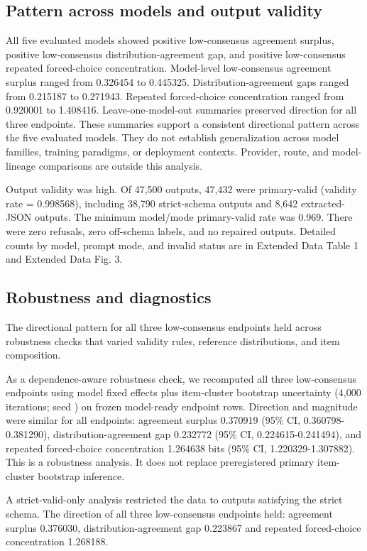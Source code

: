 \documentclass[11pt]{article}
\begin{document}
\subsection{Pattern across models and output validity}

All five evaluated models showed positive low-consensus agreement surplus, positive low-consensus distribution-agreement gap, and positive low-consensus repeated forced-choice concentration. Model-level low-consensus agreement surplus ranged from 0.326454 to 0.445325. Distribution-agreement gaps ranged from 0.215187 to 0.271943. Repeated forced-choice concentration ranged from 0.920001 to 1.408416. Leave-one-model-out summaries preserved direction for all three endpoints. These summaries support a consistent directional pattern across the five evaluated models. They do not establish generalization across model families, training paradigms, or deployment contexts. Provider, route, and model-lineage comparisons are outside this analysis.

Output validity was high. Of 47,500 outputs, 47,432 were primary-valid (validity rate = 0.998568), including 38,790 strict-schema outputs and 8,642 extracted-JSON outputs. The minimum model/mode primary-valid rate was 0.969. There were zero refusals, zero off-schema labels, and no repaired outputs. Detailed counts by model, prompt mode, and invalid status are in Extended Data Table 1 and Extended Data Fig. 3.

\subsection{Robustness and diagnostics}

The directional pattern for all three low-consensus endpoints held across robustness checks that varied validity rules, reference distributions, and item composition.

As a dependence-aware robustness check, we recomputed all three low-consensus endpoints using model fixed effects plus item-cluster bootstrap uncertainty (4,000 iterations; seed ) on frozen model-ready endpoint rows. Direction and magnitude were similar for all endpoints: agreement surplus 0.370919 (95\% CI, 0.360798-0.381290), distribution-agreement gap 0.232772 (95\% CI, 0.224615-0.241494), and repeated forced-choice concentration 1.264638 bits (95\% CI, 1.220329-1.307882). This is a robustness analysis. It does not replace preregistered primary item-cluster bootstrap inference.

A strict-valid-only analysis restricted the data to outputs satisfying the strict schema. The direction of all three low-consensus endpoints held: agreement surplus 0.376030, distribution-agreement gap 0.223867 and repeated forced-choice concentration 1.268188.
\end{document}
